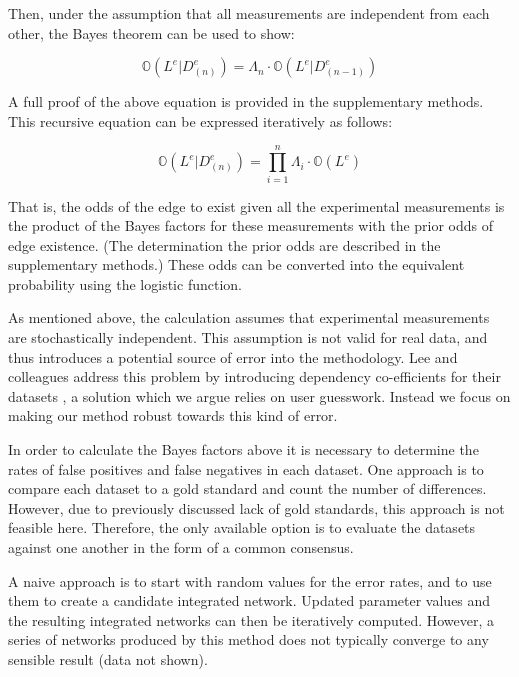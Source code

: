 \documentclass{bioinfo}
\newcommand{\odds}{\mathbb{O}}
\begin{document}
\begin{methods}
Then, under the assumption that all measurements are independent from each other, the Bayes theorem can be used to show:

\begin{equation} 
	\odds(L^e|D^e_{(n)}) = \Lambda_n \cdot \odds(L^e|D^e_{(n-1)})
\end{equation}

A full proof of the above equation is provided in the supplementary methods. This recursive equation can be expressed iteratively as follows:

\begin{equation} 
	\odds(L^e|D^e_{(n)}) = \prod_{i=1}^n \Lambda_i \cdot \odds(L^e)
\end{equation}

That is, the odds of the edge to exist given all the experimental measurements is the product of the Bayes factors for these measurements with the prior odds of edge existence. (The determination the prior odds are described in the supplementary methods.) These odds can be converted into the equivalent probability using the logistic function. 

As mentioned above, the calculation assumes that experimental measurements are stochastically independent. This assumption is not valid for real data, and thus introduces a potential source of error into the methodology. Lee and colleagues address this problem by introducing dependency co-efficients for their datasets \citep{lee_probabilistic_2004}, a solution which we argue relies on user guesswork. Instead we focus on making our method robust towards this kind of error. 

In order to calculate the Bayes factors above it is necessary to determine the rates of false positives and false negatives in each dataset. One approach is to compare each dataset to a gold standard and count the number of differences. However, due to previously discussed lack of gold standards, this approach is not feasible here. Therefore, the only available option is to evaluate the datasets against one another in the form of a common consensus. 

A naive approach is to start with random values for the error rates, and to use them to create a candidate integrated network. Updated parameter values and the resulting integrated networks can then be iteratively computed. However, a series of networks produced by this method does not typically converge to any sensible result (data not shown).


\end{methods}
\end{document}
